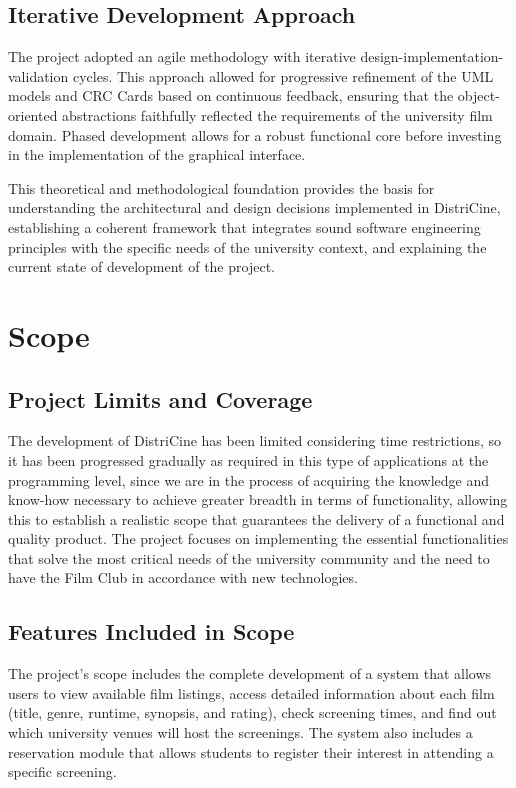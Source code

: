 \documentclass[12pt]{article}
\begin{document}
\subsection{Iterative Development Approach}
The project adopted an agile methodology with iterative design-implementation-validation cycles. This approach allowed for progressive refinement of the UML models and CRC Cards based on continuous feedback, ensuring that the object-oriented abstractions faithfully reflected the requirements of the university film domain. Phased development allows for a robust functional core before investing in the implementation of the graphical interface.

This theoretical and methodological foundation provides the basis for understanding the architectural and design decisions implemented in DistriCine, establishing a coherent framework that integrates sound software engineering principles with the specific needs of the university context, and explaining the current state of development of the project.

\section{Scope}

\subsection{Project Limits and Coverage}
The development of DistriCine has been limited considering time restrictions, so it has been progressed gradually as required in this type of applications at the programming level, since we are in the process of acquiring the knowledge and know-how necessary to achieve greater breadth in terms of functionality, allowing this to establish a realistic scope that guarantees the delivery of a functional and quality product. The project focuses on implementing the essential functionalities that solve the most critical needs of the university community and the need to have the Film Club in accordance with new technologies.

\subsection{Features Included in Scope}
The project's scope includes the complete development of a system that allows users to view available film listings, access detailed information about each film (title, genre, runtime, synopsis, and rating), check screening times, and find out which university venues will host the screenings. The system also includes a reservation module that allows students to register their interest in attending a specific screening.
\end{document}
